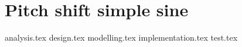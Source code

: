 
\chapter{Pitch shift simple sine}
{analysis.tex}
{design.tex}
{modelling.tex}
{implementation.tex}
{test.tex}